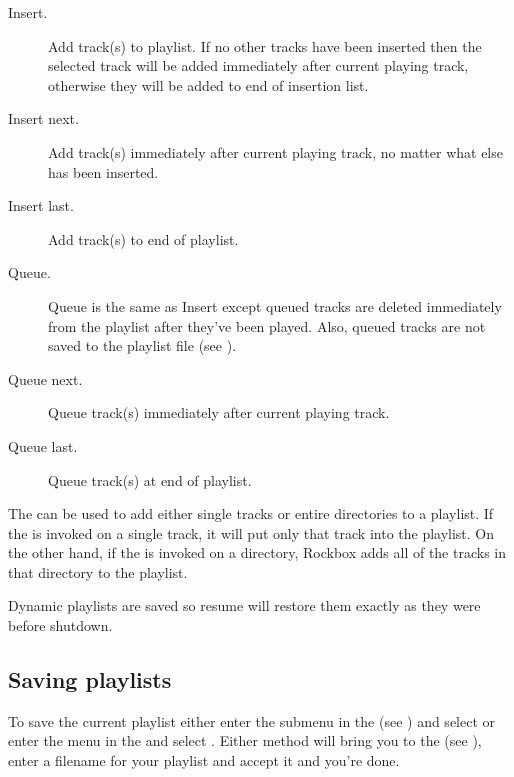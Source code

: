 \begin{description} 
\item [Insert.] Add track(s) to playlist. If no other tracks have been
  inserted then the selected track will be added immediately after current
  playing track, otherwise they will be added to end of insertion list.
  
\item [Insert next.] Add track(s) immediately after current playing
  track, no matter what else has been inserted.
  
\item [Insert last.] Add track(s) to end of playlist.
  
\item [Queue.] Queue is the same as Insert except queued tracks are
  deleted immediately from the playlist after they've been played. Also,
  queued tracks are not saved to the playlist file (see
  ).
  
\item [Queue next.] Queue track(s) immediately after current playing track.
  
\item [Queue last.] Queue track(s) at end of playlist.
\end{description}

The   can be used to add either single tracks or
entire directories to a playlist. If the  is
invoked on a single track, it will put only that track into the playlist.
On the other hand, if the  is invoked on a
directory, Rockbox adds all of the tracks in that directory to the
playlist.

Dynamic playlists are saved so resume will restore them exactly as they
were before shutdown.

\subsection{Saving playlists}
To save the current playlist either enter the  submenu
in the  (see ) and
select  or enter the
 menu in the  and select
.
Either method will bring you to the  (see
), enter a filename for your playlist and
accept it and you're done.

